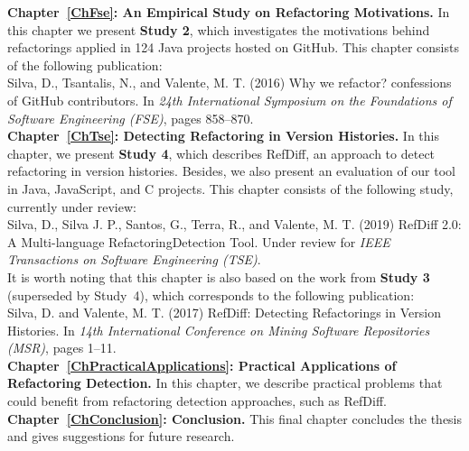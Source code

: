 \noindent\textbf{Chapter~\ref{ChFse}: An Empirical Study on Refactoring Motivations.} In this chapter we present \textbf{Study 2}, which investigates the motivations behind refactorings applied in 124 Java projects hosted on GitHub. This chapter consists of the following publication:
\\[6pt]
\noindent Silva, D., Tsantalis, N., and Valente, M. T. (2016) Why we refactor? confessions of GitHub contributors. In \emph{24th International Symposium on the Foundations of Software Engineering (FSE)}, pages 858--870.
\\[6pt]

\noindent\textbf{Chapter~\ref{ChTse}: Detecting Refactoring in Version Histories.} In this chapter, we present \textbf{Study 4}, which describes RefDiff, an approach to detect refactoring in version histories. Besides, we also present an evaluation of our tool in Java, JavaScript, and C projects. This chapter consists of the following study, currently under review:
\\[6pt]
\noindent Silva, D., Silva J. P., Santos, G., Terra, R., and Valente, M. T. (2019) RefDiff 2.0: A Multi-language RefactoringDetection Tool. Under review for \emph{IEEE Transactions on Software Engineering (TSE)}.
\\[6pt]
It is worth noting that this chapter is also based on the work from \textbf{Study 3} (superseded by Study~4), which corresponds to the following publication:
\\[6pt]
\noindent Silva, D. and Valente, M. T. (2017) RefDiff: Detecting Refactorings in Version Histories. In \emph{14th International Conference on Mining Software Repositories (MSR)}, pages 1--11.
\\[6pt]

\noindent\textbf{Chapter~\ref{ChPracticalApplications}: Practical Applications of Refactoring Detection.} In this chapter, we describe practical problems that could benefit from refactoring detection approaches, such as RefDiff.
\\[6pt]

\noindent\textbf{Chapter~\ref{ChConclusion}: Conclusion.} This final chapter concludes the thesis and gives suggestions for future research.

